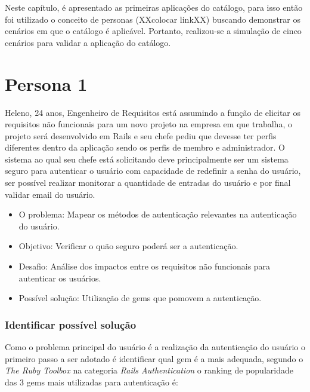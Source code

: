 Neste capítulo, é apresentado as primeiras aplicações do catálogo, para isso então foi utilizado o conceito de personas (XXcolocar linkXX) buscando demonstrar os cenários em que o catálogo é aplicável. Portanto, realizou-se a simulação de cinco cenários para validar a aplicação do catálogo.



\section{Persona 1}

Heleno, 24 anos, Engenheiro de Requisitos está assumindo a função de elicitar os requisitos não funcionais para um novo projeto na empresa em que trabalha, o projeto será desenvolvido em Rails e seu chefe pediu que devesse ter perfis diferentes dentro da aplicação sendo os perfis de membro e administrador. O sistema ao qual seu chefe está solicitando deve principalmente ser um sistema seguro para autenticar o usuário com capacidade de redefinir a senha do usuário, ser possível realizar monitorar a quantidade de entradas do usuário e por final validar email do usuário.

\begin{itemize}
	\item O problema: Mapear os métodos de autenticação relevantes na autenticação do usuário. 
	\item Objetivo: Verificar o quão seguro poderá ser a autenticação. 
	\item Desafio: Análise dos impactos entre os requisitos não funcionais para autenticar os usuários.
	\item Possível solução: Utilização de gems que pomovem a autenticação.
\end{itemize}


\subsubsection{Identificar possível solução}

Como o problema principal do usuário é a realização da autenticação do usuário o primeiro passo a ser adotado é identificar qual gem é a mais adequada, segundo o \textit{The Ruby Toolbox} na categoria \textit{Rails Authentication} o ranking de popularidade das 3 gems mais utilizadas para autenticação é:

